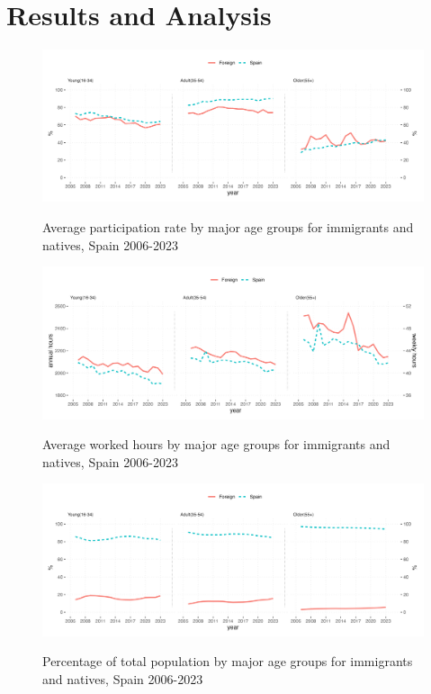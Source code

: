 \section{Results and Analysis}

\begin{figure}[H]%
    \caption{Average participation rate by major age groups for immigrants and natives, Spain 2006-2023}
    \includegraphics[width=1\textwidth]{../graph/wpx.png}%
    \label{fig:labDecomp}%
\end{figure}%
  


\begin{figure}[H]%
    \caption{Average worked hours by major age groups for immigrants and natives, Spain 2006-2023}
    \includegraphics[width=1\textwidth]{../graph/whx.png}%
    \label{fig:labDecomp}%
\end{figure}%

\begin{figure}[H]%
    \caption{Percentage of total population by major age groups for immigrants and natives, Spain 2006-2023}
    \includegraphics[width=1\textwidth]{../graph/stx.png}%
    \label{fig:labDecomp}%
\end{figure}%
